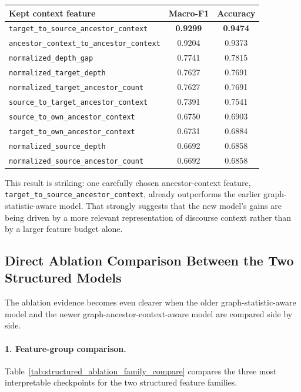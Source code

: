 \documentclass[11pt,a4paper]{article}
\begin{document}
\begin{center}
\begin{tabular}{lcc}
\toprule
Kept context feature & Macro-F1 & Accuracy \\
\midrule
\texttt{target\_to\_source\_ancestor\_context} & \textbf{0.9299} & \textbf{0.9474} \\
\texttt{ancestor\_context\_to\_ancestor\_context} & 0.9204 & 0.9373 \\
\texttt{normalized\_depth\_gap} & 0.7741 & 0.7815 \\
\texttt{normalized\_target\_depth} & 0.7627 & 0.7691 \\
\texttt{normalized\_target\_ancestor\_count} & 0.7627 & 0.7691 \\
\texttt{source\_to\_target\_ancestor\_context} & 0.7391 & 0.7541 \\
\texttt{source\_to\_own\_ancestor\_context} & 0.6750 & 0.6903 \\
\texttt{target\_to\_own\_ancestor\_context} & 0.6731 & 0.6884 \\
\texttt{normalized\_source\_depth} & 0.6692 & 0.6858 \\
\texttt{normalized\_source\_ancestor\_count} & 0.6692 & 0.6858 \\
\bottomrule
\end{tabular}
\end{center}

This result is striking: one carefully chosen ancestor-context feature, \texttt{target\_to\_source\_ancestor\_context}, already outperforms the earlier graph-statistic-aware model. That strongly suggests that the new model's gains are being driven by a more relevant representation of discourse context rather than by a larger feature budget alone.

\subsection{Direct Ablation Comparison Between the Two Structured Models}
The ablation evidence becomes even clearer when the older graph-statistic-aware model and the newer graph-ancestor-context-aware model are compared side by side.

\paragraph{1. Feature-group comparison.}
Table~\ref{tab:structured_ablation_family_compare} compares the three most interpretable checkpoints for the two structured feature families.
\end{document}
